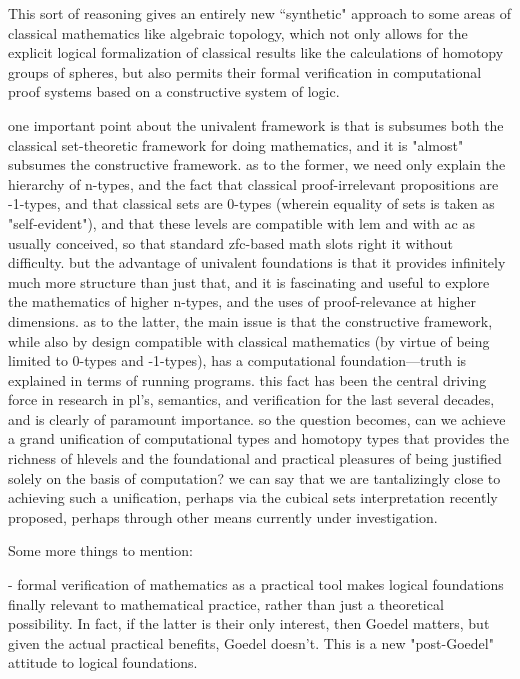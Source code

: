 \documentclass[11pt]{article}
\theoremstyle{remark}
\theoremstyle{definition}
\begin{document}
This sort of reasoning gives an entirely new ``synthetic" approach to some areas of classical mathematics like algebraic topology, which not only allows for the explicit logical formalization of classical results like the calculations of homotopy groups of spheres, but also permits their formal verification in computational proof systems based on a constructive system of logic.


one important point about the univalent framework is that is subsumes both the classical set-theoretic framework for doing mathematics, and it is "almost" subsumes the constructive framework.  as to the former, we need only explain the hierarchy of n-types, and the fact that classical proof-irrelevant propositions are -1-types, and that classical sets are 0-types (wherein equality of sets is taken as "self-evident"), and that these levels are compatible with lem and with ac as usually conceived, so that standard zfc-based math slots right it without difficulty.  but the advantage of univalent foundations is that it provides infinitely much more structure than just that, and it is fascinating and useful to explore the mathematics of higher n-types, and the uses of proof-relevance at higher dimensions.  as to the latter, the main issue is that the constructive framework, while also by design compatible with classical mathematics (by virtue of being limited to 0-types and -1-types), has a computational foundation---truth is explained in terms of running programs.  this fact has been the central driving force in research in pl's, semantics, and verification for the last several decades, and is clearly of paramount importance.  so the question becomes, can we achieve a grand unification of computational types and homotopy types that provides the richness of hlevels and the foundational and practical pleasures of being justified solely on the basis of computation?  we can say that we are tantalizingly close to achieving such a unification, perhaps via the cubical sets interpretation recently proposed, perhaps through other means currently under investigation.

Some more things to mention:

- formal verification of mathematics as a practical tool makes logical foundations finally relevant to mathematical practice, rather than just a theoretical possibility.  In fact, if the latter is their only interest, then Goedel matters, but given the actual practical benefits, Goedel doesn't. This is a new "post-Goedel" attitude to logical foundations. 
\end{document}

